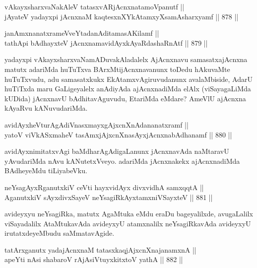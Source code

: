 
\begin{shl}
vAkayxsharxvaNakAleV tatasxvARjAcnxnatamoVpanutf || \\
jAyateV yadayxpi jAcnxnaM kaqtesxnXYkAtamxyXsamAsharxyamf \hfill || 878 ||  
\end{shl}
				
\begin{shl}
janAmxnanatxrameVveYtadanAditamasA\s Kilamf || \\
tathA\s pi bAdhayxteV jAcnxnamavidAyxkAyaRdashaRnAtf \hfill || 879 ||  
\end{shl}

\begin{artha}
yadayxpi vAkayxsharxvaNamADuvakAladalelx AjAcnxnavu samasatxajAcnxna matutx adariMda huTuTxva BArxMtijAcnxnavanunx toDedu hAkuvaMte huTuTxvudu, adu samasatxkukx EkAtamxvAgiruvudanunx avalaMbiside, AdarU huTiTxda maru GaLigeyalelx anAdiyAda ajAcnxnadiMda elAlx (viSayagaLiMda kUDida) jAcnxnavU bAdhitavAguvudu, EtariMda eMdare? AmeVlU ajAcnxna kAyaRvu kANuvudariMda.
\end{artha}

\begin{shl}
avidAyxheVturAgAdiVnasxmayxgAjxcnXnAdananatxramf || \\
yatoV viVkASxmaheV tasAmxjAjxcnXnasAyxjAcnxnabAdhanamf \hfill || 880 ||  
\end{shl}

\begin{artha}
avidAyxnimitatxvAgi baMdharAgAdigaLanunx jAcnxnavAda naMtaravU yAvudariMda nAvu kANutetxVveyo. adariMda jAcnxnakekx ajAcnxnadiMda BAdheyeMdu tiLiyabeVku.
\end{artha}

\begin{shl}
neYsagAyxRganutxkiV ceVti hayxvidAyx divxvidhA samxqqtA || \\
AganutxkiV sAyxdivxSayeV neYsagiRkAyxtamxniVSayxteV \hfill || 881 ||  
\end{shl}

\begin{artha}
avideyxyu neYsagiRka, matutx AgaMtuka eMdu eraDu bageyalilxde, avugaLalilx viSayadalilx AtaMtukavAda avideyxyU atamxnalilx neYsagiRkavAda avideyxyU irutatxdeyeMbudu saMmatavAgide.
\end{artha}


\begin{shl}
tatArx\s \s ganutx yadajAcnxnaM tatasxkaqjAjxcnXnajanamxnA || \\
apeYti nAsi shabaroV rAjA\s siVtuyxkitxtoV yathA \hfill || 882 ||  
\end{shl}
				
